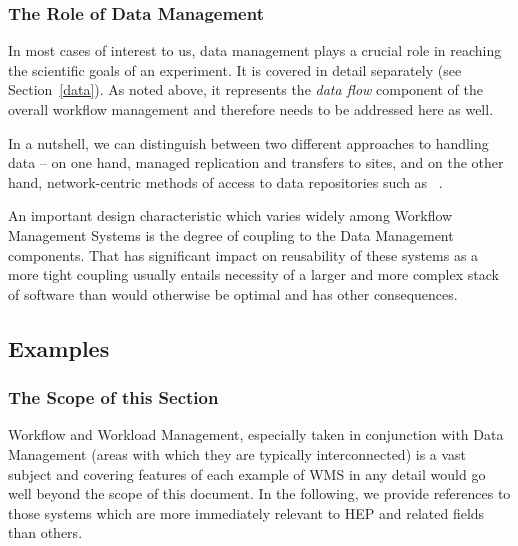 \subsubsection{The Role of Data Management}
In most cases of interest to us, data management plays a crucial role in reaching the scientific goals of an experiment. It is covered in detail separately (see Section~\ref{data}).
As noted above, it represents the \textit{data flow} component of the overall workflow management and therefore needs to be addressed here as well.

In a nutshell, we can distinguish between two different approaches to handling data -- on one hand, managed replication and transfers to sites, and on the other hand, network-centric
methods of access to data repositories such as \xrootd~\cite{xrootd,xrootd_web}.

An important design characteristic which varies widely among Workflow Management Systems is the degree of coupling to the Data Management components. That has significant impact
on reusability of these systems as a more tight coupling usually entails necessity of a larger and more complex stack of software than would otherwise be optimal and has other consequences.

\subsection{Examples}
\label{wms_examples}
\subsubsection{The Scope of this Section}
Workflow and Workload Management, especially taken in conjunction with Data Management (areas with which they are typically interconnected) is a vast
subject and  covering features of each example of WMS in any detail would go well beyond the scope of this document. In the following, we provide references
to those systems which are more immediately relevant to HEP and related fields than others.


